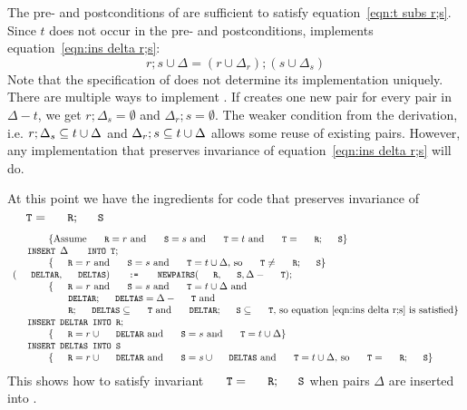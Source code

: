 \documentclass{svproc}
\begin{document}
	The pre- and postconditions of  are sufficient to satisfy equation~\ref{eqn:t subs r;s}.
	Since $t$ does not occur in the pre- and postconditions,  implements equation~\ref{eqn:ins delta r;s}:
\begin{equation}
r;s\cup\Delta=(r\cup \Delta_r);(s\cup \Delta_s)\label{eqn:ins delta r;s}
\end{equation}
	Note that the specification of  does not determine its implementation uniquely.
	There are multiple ways to implement .
	If  creates one new pair for every pair in $\Delta-t$,
	we get $r;\Delta_s=\emptyset$ and $\Delta_r;s=\emptyset$.
	The weaker condition from the derivation, i.e. $r;\Delta_s\subseteq t\cup\Delta$ and $\Delta_r;s\subseteq t\cup\Delta$ allows some reuse of existing pairs.
	However, any implementation that preserves invariance of equation~\ref{eqn:ins delta r;s} will do.

	At this point we have the ingredients for code that preserves invariance of $\code{T}=\code{R};\code{S}$
\[\begin{array}{l}
\hspace{0.5in}\{\text{Assume }\code{R}=r\text{ and }\code{S}=s\text{ and }\code{T}=t\text{ and }\code{T}=\code{R};\code{S}\}\\
\code{INSERT }\Delta\code{ INTO T};\\
\hspace{0.5in}\{\code{R}=r\text{ and }\code{S}=s\text{ and }\code{T}=t\cup\Delta\text{, so }\code{T}\neq\code{R};\code{S}\}\\
(\code{DELTAR},\code{DELTAS})\code{ := }\code{NEWPAIRS}(\code{R}, \code{S}, \Delta-\code{T});\\
\hspace{0.5in}\{\code{R}=r\text{ and }\code{S}=s\text{ and }\code{T}=t\cup\Delta\text{ and }\\
\hspace{0.575in}\code{DELTAR};\code{DELTAS}=\Delta-\code{T}\text{ and }\\
\hspace{0.575in}\code{R};\code{DELTAS}\subs\code{T}\text{ and }\code{DELTAR};\code{S}\subs\code{T}\text{, so equation~\ref{eqn:ins delta r;s} is satisfied}\}\\
\code{INSERT DELTAR INTO R};\\
\hspace{0.5in}\{\code{R}=r\cup\code{DELTAR}\text{ and }\code{S}=s\text{ and }\code{T}=t\cup\Delta\}\\
\code{INSERT DELTAS INTO S}\\
\hspace{0.5in}\{\code{R}=r\cup\code{DELTAR}\text{ and }\code{S}=s\cup\code{DELTAS}\text{ and }\code{T}=t\cup\Delta\text{, so }\code{T}=\code{R};\code{S}\}
\end{array}\]
    This shows how to satisfy invariant $\code{T}=\code{R};\code{S}$ when pairs $\Delta$ are inserted into .
\end{document}
